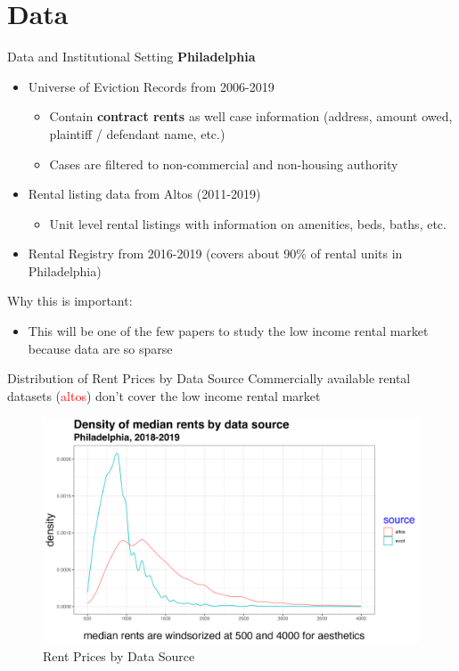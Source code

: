\documentclass[10pt, xcolor=dvipsnames]{beamer}
\begin{document}
    


\section{Data}

\begin{frame}{Data and Institutional Setting}
\textbf{Philadelphia}
    \begin{itemize}
        \item Universe of Eviction Records from 2006-2019
        \begin{itemize}
            \item Contain \textbf{contract rents} as well case information (address, amount owed, plaintiff / defendant name, etc.)
            \item Cases are filtered to non-commercial and non-housing authority
        \end{itemize}
        \item Rental listing data from Altos (2011-2019)
        \begin{itemize}
            \item Unit level rental listings with information on amenities, beds, baths, etc. 
        \end{itemize}
        \item Rental Registry from 2016-2019 (covers about 90\% of rental units in Philadelphia)
    \end{itemize}
    \pause
    Why this is important:\\
    \begin{itemize}
        \item This will be one of the few papers to study the low income rental market because data are so sparse 
    \end{itemize}
\end{frame}

\begin{frame}{Distribution of Rent Prices by Data Source}
Commercially available rental datasets (\textcolor{red}{altos}) don't cover the low income rental market\\
    \begin{figure}
        \centering
        \includegraphics[width=0.75\linewidth]{figs/density_rent_prices.png}
        \caption{Rent Prices by Data Source}
        \label{fig:rent-dist}
    \end{figure}
\end{frame}
\end{document}
